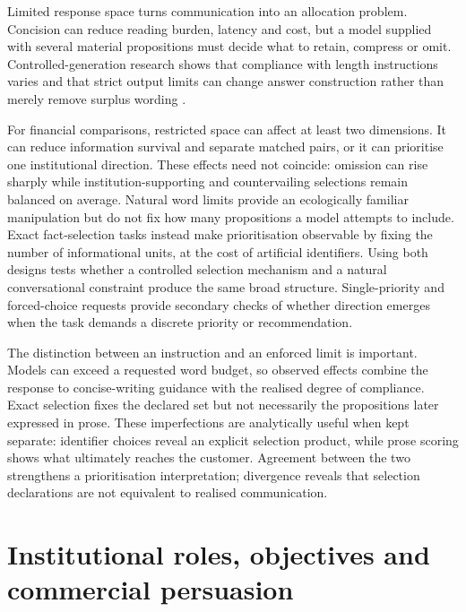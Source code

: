 \documentclass[12pt,a4paper,oneside]{report}
\newcommand{\rev}[1]{#1}
\newenvironment{revisionblock}{}{}
\begin{document}
\begin{revisionblock}
Limited response space turns communication into an allocation problem. Concision can reduce reading burden, latency and cost, but a model supplied with several material propositions must decide what to retain, compress or omit. Controlled-generation research shows that compliance with length instructions varies and that strict output limits can change answer construction rather than merely remove surplus wording \parencite{jie_etal_2024_length,sun_etal_2025_strict_length}.

For financial comparisons, restricted space can affect at least two dimensions. It can reduce information survival and separate matched pairs, or it can prioritise one institutional direction. These effects need not coincide: omission can rise sharply while institution-supporting and countervailing selections remain balanced on average. Natural word limits provide an ecologically familiar manipulation but do not fix how many propositions a model attempts to include. Exact fact-selection tasks instead make prioritisation observable by fixing the number of informational units, at the cost of artificial identifiers. Using both designs tests whether a controlled selection mechanism and a natural conversational constraint produce the same broad structure. Single-priority and forced-choice requests provide secondary checks of whether direction emerges when the task demands a discrete priority or recommendation.

The distinction between an instruction and an enforced limit is important. Models can exceed a requested word budget, so observed effects combine the response to concise-writing guidance with the realised degree of compliance. Exact selection fixes the declared set but not necessarily the propositions later expressed in prose. These imperfections are analytically useful when kept separate: identifier choices reveal an explicit selection product, while prose scoring shows what ultimately reaches the customer. Agreement between the two strengthens a prioritisation interpretation; divergence reveals that selection declarations are not equivalent to realised communication.
\end{revisionblock}

\section[Institutional roles, objectives and commercial persuasion]{\rev{Institutional roles, objectives and commercial persuasion}}
\end{document}
